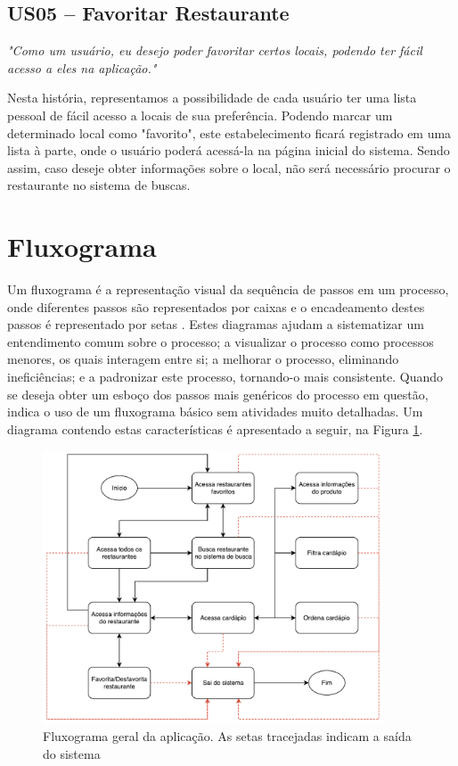 \subsection{US05 -- Favoritar Restaurante}

\textit{"Como um usuário, eu desejo poder favoritar certos locais, podendo ter fácil acesso a eles na aplicação."}

Nesta história, representamos a possibilidade de cada usuário ter uma lista pessoal de fácil acesso a locais de sua preferência. Podendo marcar um determinado local como "favorito", este estabelecimento ficará registrado em uma lista à parte, onde o usuário poderá acessá-la na página inicial do sistema. Sendo assim, caso deseje obter informações sobre o local, não será necessário procurar o restaurante no sistema de buscas.

\section{Fluxograma}
Um fluxograma é a representação visual da sequência de passos em um processo, onde diferentes passos são representados por caixas e o encadeamento destes passos é representado por setas \cite{REYNARD1995}. Estes diagramas ajudam a sistematizar um entendimento comum sobre o processo; a visualizar o processo como processos menores, os quais interagem entre si; a melhorar o processo, eliminando ineficiências; e a padronizar este processo, tornando-o mais consistente. Quando se deseja obter um esboço dos passos mais genéricos do processo em questão, \cite{REYNARD1995} indica o uso de um fluxograma básico sem atividades muito detalhadas. Um diagrama contendo estas características é apresentado a seguir, na Figura \ref{fig:fluxograma}.

\begin{figure}[H]
    \centering
    \caption[Fluxograma Geral do Sistema]{\label{fig:fluxograma}Fluxograma geral da aplicação. As setas tracejadas indicam a saída do sistema}
    \includegraphics[width=0.9\textwidth]{./pdf/fluxograma-atual.pdf}
\end{figure}


